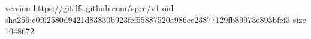 version https://git-lfs.github.com/spec/v1
oid sha256:c0f62580d9421d83830b923fef55887520a986ee23877129fb89973e893bfef3
size 1048672
